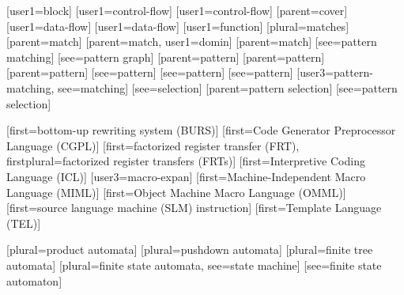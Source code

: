 [user1={block}]
[user1={control-flow}]
[user1={control-flow}]
[parent={cover}]
[user1={data-flow}]
[user1={data-flow}]
[user1={function}]
[plural=matches]
[parent={match}]
[parent={match}, user1={domin}]
[parent={match}]
[see={pattern matching}]
[see={pattern graph}]
[parent={pattern}]
[parent={pattern}]
[parent={pattern}]
[see={pattern}]
[see={pattern}]
[see={pattern}]
[user3={pattern-matching}, see={matching}]
[see={selection}]
[parent={pattern selection}]
[see={pattern selection}]

[first={bottom-up rewriting system (BURS)}]
[first={Code Generator Preprocessor Language (CGPL)}]
%
        [first=factorized register transfer (FRT),
         firstplural=factorized register transfers (FRTs)]
[first={Interpretive Coding Language (ICL)}]
[user3={macro-expan}]%
[first={Machine-Independent Macro Language (MIML)}]
[first={Object Machine Macro Language (OMML)}]
%
        [first={source language machine (SLM) instruction}]
[first={Template Language (TEL)}]

[plural={product automata}]
[plural={pushdown automata}]
%
        [plural={finite tree automata}]
%
        [plural={finite state automata}, see={state machine}]
[see={finite state automaton}]
